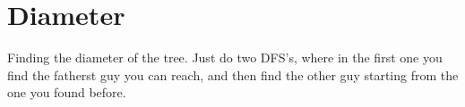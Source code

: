 
    \section{Diameter}
    Finding the diameter of the tree. Just do two DFS's, where in the first one you find the fatherst guy you can reach, and then find the other guy starting from the one you found before.
